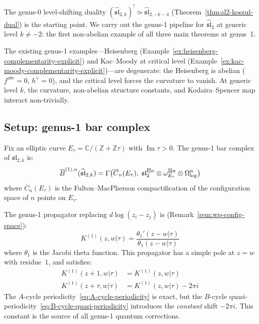 The genus-0 level-shifting duality $(\widehat{\mathfrak{sl}}_{2,k})^! \simeq \widehat{\mathfrak{sl}}_{2,-k-4}$ (Theorem~\ref{thm:sl2-koszul-dual}) is the starting point.  We carry out the genus-1 pipeline for $\widehat{\mathfrak{sl}}_2$ at generic level $k \neq -2$: the first non-abelian example of all three main theorems at genus~1.

The existing genus-1 examples---Heisenberg (Example~\ref{ex:heisenberg-complementarity-explicit}) and Kac--Moody at critical level (Example~\ref{ex:kac-moody-complementarity-explicit})---are degenerate: the Heisenberg is abelian ($f^{abc}=0$, $h^\vee=0$), and the critical level forces the curvature to vanish.  At generic level $k$, the curvature, non-abelian structure constants, and Kodaira--Spencer map interact non-trivially.

\subsection{Setup: genus-1 bar complex}

Fix an elliptic curve $E_\tau = \mathbb{C}/(\mathbb{Z}+\mathbb{Z}\tau)$ with $\operatorname{Im}\tau>0$.  The genus-1 bar complex of $\widehat{\mathfrak{sl}}_{2,k}$ is:
\begin{equation}\label{eq:sl2-genus1-bar}
\overline{B}^{(1),n}(\widehat{\mathfrak{sl}}_{2,k}) = \Gamma\bigl(\overline{C}_n(E_\tau),\; \mathfrak{sl}_2^{\boxtimes n} \otimes \omega_{E_\tau}^{\boxtimes n} \otimes \Omega^n_{\log}\bigr)
\end{equation}
where $\overline{C}_n(E_\tau)$ is the Fulton--MacPherson compactification of the configuration space of $n$ points on $E_\tau$.

The genus-1 propagator replacing $d\log(z_i - z_j)$ is (Remark~\ref{rem:wp-config-space}):
\begin{equation}\label{eq:genus1-propagator}
K^{(1)}(z,w|\tau) = \frac{\theta_1'(z-w|\tau)}{\theta_1(z-w|\tau)}
\end{equation}
where $\theta_1$ is the Jacobi theta function.  This propagator has a simple pole at $z=w$ with residue~$1$, and satisfies:
\begin{align}
K^{(1)}(z+1,w|\tau) &= K^{(1)}(z,w|\tau) \label{eq:A-cycle-periodicity} \\
K^{(1)}(z+\tau,w|\tau) &= K^{(1)}(z,w|\tau) - 2\pi i \label{eq:B-cycle-quasi-periodicity}
\end{align}
The $A$-cycle periodicity~\eqref{eq:A-cycle-periodicity} is exact, but the $B$-cycle quasi-periodicity~\eqref{eq:B-cycle-quasi-periodicity} introduces the \emph{constant} shift $-2\pi i$.  This constant is the source of all genus-1 quantum corrections.

